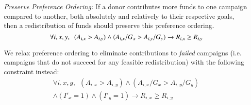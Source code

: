 \begin{enumerate}[label={[\bf\sc{Order}]},wide =1em]
\item \emph{Preserve Preference Ordering:} If a donor contributes more funds to one campaign compared to another, both absolutely and relatively to their respective goals, then a redistribution of funds should preserve this preference ordering.
\[\forall i,x,y, \;\  (A_{i, x} > A_{i, y}) \land (A_{i, x}/G_x > A_{i, y}/G_y) \\
\rightarrow  R_{i, x} \geq R_{i, y} \]

We relax preference ordering to eliminate contributions to \textit{failed} campaigns (i.e. campaigns that do not succeed for any feasible redistribution) with the following constraint instead:
\begin{multline*}
\forall i,x,y, \;\  (A_{i, x} > A_{i, y}) \land (A_{i, x}/G_x > A_{i, y}/G_y) \\
\land (I'_x = 1) \land (I'_y = 1) 
\rightarrow R_{i, x} \geq R_{i, y}
\end{multline*}
\end{enumerate}


